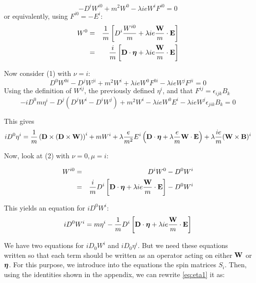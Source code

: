 \begin{equation*}
-D^i W ^{i0} + m^2 W^0 - \lambda i e W^{i} F^{i0} = 0
\end{equation*}
or equivalently, using $F^{i0} = -E^i$:
\begin{eqnarray*}
W^0	&=&	\frac{1}{m} \left [ D^i \frac{W^{i0}}{m} + \lambda ie \frac{\mathbf{W}}{m} \cdot \mathbf{E}  \right ]	\\
	&=&	\frac{i}{m} \left [ \mathbf{D} \cdot \mbox{\boldmath$ \eta $} + \lambda ie \frac{\mathbf{W}}{m} \cdot \mathbf{E}  \right ]
\end{eqnarray*}

Now consider (1) with $\nu=i$:
\begin{equation*}
D^0 W^{0i} - D^j W^{ji} + m^2 W^{i} + \lambda ieW^0 F^{0i} - \lambda ieW^{j} F^{ji} = 0
\end{equation*}
Using the definition of $W^{ij}$, the previously defined $\eta^i$, and that $F^{ij} = \epsilon_{ijk} B_k$
\begin{equation*}
-i D^0 m \eta^i - D^j (D^j W^i - D^i W^j) + m^2 W^i - \lambda ieW^0 E^i  - \lambda ieW^{j} \epsilon_{jik} B_k = 0
\end{equation*}

This gives
\begin{equation} \label{eq:eta1}
iD^0 \eta^i = \frac{1}{m} \left (\mathbf{D} \times (\mathbf{D} \times \mathbf{W}) \right)^i + m W^i + \lambda\frac{e}{m^2} E^i \left( \mathbf{D} \cdot \mbox{\boldmath$ \eta $} + \lambda \frac{e}{m} \mathbf{W} \cdot \mathbf{E} \right) + \lambda \frac{ie}{m} (\mathbf{W} \times \mathbf{B} )^i
\end{equation}

Now, look at (2) with $\nu=0, \mu=i$:

\begin{eqnarray*}
W^{i0} 
	&=& 	D^i W^0 - D^0 W^i		\\
	&=&	 \frac{i}{m} D^i \left [ \mathbf{D} \cdot \mbox{\boldmath$ \eta $} + \lambda ie \frac{\mathbf{W}}{m} \cdot \mathbf{E}  \right ] - D^0 W^i
\end{eqnarray*}

This yields an equation for $iD^0 W^i$:
\begin{equation}\label{eq:W1}
i D^0 W^i = 
	m \eta^i - \frac{1}{m} D^i \left [ \mathbf{D} \cdot \mbox{\boldmath$ \eta $} + \lambda ie \frac{\mathbf{W}}{m} \cdot \mathbf{E}  \right ]
\end{equation}

We have two equations for $i D_0 W^i$ and $i D_0 \eta^i$.  But we need these equations written so that each term should be written as an operator acting on either $\mathbf{W}$ or $\mbox{\boldmath$ \eta $}$. For this purpose, we introduce into the equations the spin matrices $S_i$.  Then, using the identities shown in the appendix, we can rewrite \eqref{eq:eta1} it as:

